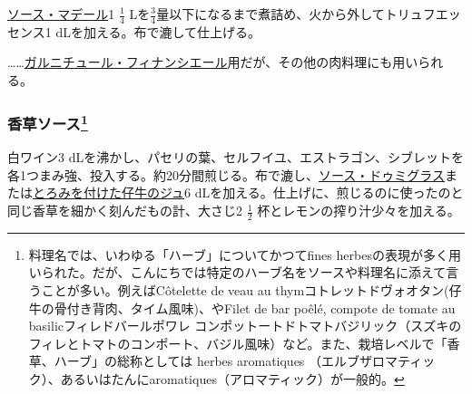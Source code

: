 \begin{recette}


\protect\hyperlink{sauce-madere}{ソース・マデール}1 \(\frac{1}{4}\)
Lを\(\frac{3}{4}\)量以下になるまで煮詰め、火から外してトリュフエッセンス1
dLを加える。布で漉して仕上げる。

\ldots{}\ldots{}\protect\hyperlink{garniture-a-la-financiere}{ガルニチュール・フィナンシエール}用だが、その他の肉料理にも用いられる。

\hypertarget{sauce-aux-fines-herbes}{%
\subsubsection[香草ソース]{\texorpdfstring{香草ソース\footnote{料理名では、いわゆる「ハーブ」についてかつてfines
  herbesの表現が多く用いられた。だが、こんにちでは特定のハーブ名をソースや料理名に添えて言うことが多い。例えばCôtelette
  de veau au
  thymコトレットドヴォオタン(仔牛の骨付き背肉、タイム風味)、やFilet de
  bar poêlé, compote de tomate au basilicフィレドバールポワレ
  コンポットートドトマトバジリック（スズキのフィレとトマトのコンポート、バジル風味）など。また、栽培レベルで「香草、ハーブ」の総称としては
  herbes aromatiques
  （エルブザロマティック）、あるいはたんにaromatiques（アロマティック）が一般的。}}{香草ソース}}\label{sauce-aux-fines-herbes}}



白ワイン3
dLを沸かし、パセリの葉、セルフイユ、エストラゴン、シブレットを各1つまみ強、投入する。約20分間煎じる。布で漉し、\protect\hyperlink{sauce-demi-glace}{ソース・ドゥミグラス}または\protect\hyperlink{jus-de-veau-lie}{とろみを付けた仔牛のジュ}6
dLを加える。仕上げに、煎じるのに使ったのと同じ香草を細かく刻んだもの計、大さじ2
\(\frac{1}{2}\) 杯とレモンの搾り汁少々を加える。


\end{recette}
